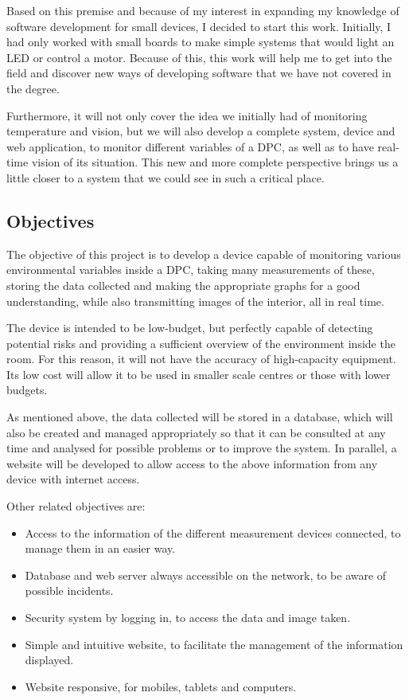 Based on this premise and because of my interest in expanding my knowledge of software development for small devices, I decided to start this work. Initially, I had only worked with small boards to make simple systems that would light an LED or control a motor. Because of this, this work will help me to get into the field and discover new ways of developing software that we have not covered in the degree.
\pagebreak

Furthermore, it will not only cover the idea we initially had of monitoring temperature and vision, but we will also develop a complete system, device and web application, to monitor different variables of a DPC, as well as to have real-time vision of its situation. This new and more complete perspective brings us a little closer to a system that we could see in such a critical place.

\subsection{Objectives}\label{subsec:objectives}
The objective of this project is to develop a device capable of monitoring various environmental variables inside a DPC, taking many measurements of these, storing the data collected and making the appropriate graphs for a good understanding, while also transmitting images of the interior, all in real time.

The device is intended to be low-budget, but perfectly capable of detecting potential risks and providing a sufficient overview of the environment inside the room. For this reason, it will not have the accuracy of high-capacity equipment. Its low cost will allow it to be used in smaller scale centres or those with lower budgets.

As mentioned above, the data collected will be stored in a database, which will also be created and managed appropriately so that it can be consulted at any time and analysed for possible problems or to improve the system. In parallel, a website will be developed to allow access to the above information from any device with internet access.

Other related objectives are:
\begin{itemize}
	\item Access to the information of the different measurement devices connected, to manage them in an easier way.
	\item Database and web server always accessible on the network, to be aware of possible incidents.
	\item Security system by logging in, to access the data and image taken.
	\item Simple and intuitive website, to facilitate the management of the information displayed.
	\item Website responsive, for mobiles, tablets and computers.
\end{itemize}

